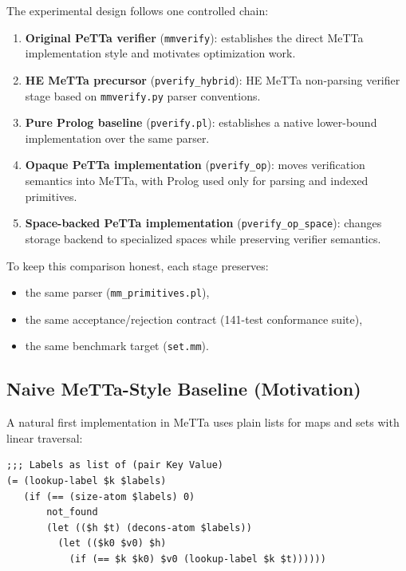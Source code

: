 \documentclass[11pt]{article}
\begin{document}
The experimental design follows one controlled chain:
\begin{enumerate}[leftmargin=2em]
  \item \textbf{Original PeTTa verifier}
    (\texttt{mmverify}): establishes the direct MeTTa implementation
    style and motivates optimization work.
  \item \textbf{HE MeTTa precursor}
    (\texttt{pverify\_hybrid}): HE MeTTa non-parsing verifier stage
    based on \texttt{mmverify.py} parser conventions.
  \item \textbf{Pure Prolog baseline}
    (\texttt{pverify.pl}): establishes a native lower-bound
    implementation over the same parser.
  \item \textbf{Opaque PeTTa implementation}
    (\texttt{pverify\_op}): moves verification semantics into MeTTa,
    with Prolog used only for parsing and indexed primitives.
  \item \textbf{Space-backed PeTTa implementation}
    (\texttt{pverify\_op\_space}): changes storage backend to
    specialized spaces while preserving verifier semantics.
\end{enumerate}

To keep this comparison honest, each stage preserves:
\begin{itemize}[leftmargin=2em]
  \item the same parser (\texttt{mm\_primitives.pl}),
  \item the same acceptance/rejection contract
    (141-test conformance suite),
  \item the same benchmark target (\texttt{set.mm}).
\end{itemize}

\subsection{Naive MeTTa-Style Baseline (Motivation)}
\label{sec:naive-metta}

A natural first implementation in MeTTa uses plain lists for maps and
sets with linear traversal:
\begin{lstlisting}[language=MeTTa,caption={Naive MeTTa-style lookup (linear scan).}]
;;; Labels as list of (pair Key Value)
(= (lookup-label $k $labels)
   (if (== (size-atom $labels) 0)
       not_found
       (let (($h $t) (decons-atom $labels))
         (let (($k0 $v0) $h)
           (if (== $k $k0) $v0 (lookup-label $k $t))))))
\end{lstlisting}
\end{document}
